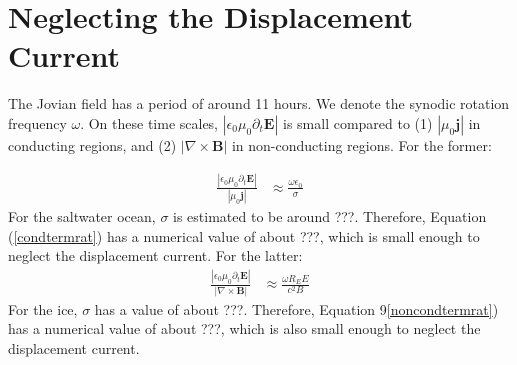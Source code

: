 \documentclass{article}
\begin{document}

\appendix
\section{Neglecting the Displacement Current} \label{Appendix_Displacement_Current}
The Jovian field has a period of around 11 hours. We denote the synodic rotation frequency $\omega$. On these time scales, $|\epsilon_0\mu_0\partial_t\mathbf{E}|$ is small  compared to (1) $|\mu_0\mathbf{j}|$ in conducting regions, and (2) $|\nabla\times\mathbf{B}|$ in non-conducting regions. For the former:

\begin{align}
    \frac{\left|\epsilon_0\mu_0\partial_t\mathbf{E}\right|}{\left|\mu_0\mathbf{j}\right|} &\approx \frac{\omega\epsilon_0}{\sigma} \label{condtermrat}
\end{align}
For the saltwater ocean, $\sigma$ is estimated to be around ???. Therefore, Equation (\ref{condtermrat}) has a numerical value of about ???, which is small enough to neglect the displacement current. For the latter:
\begin{align}
    \frac{\left|\epsilon_0\mu_0\partial_t\mathbf{E}\right|}{\left|\nabla\times\mathbf{B}\right|} &\approx \frac{\omega R_EE}{c^2B} \label{noncondtermrat}
\end{align}
 For the ice, $\sigma$ has a value of about ???. Therefore, Equation 9\ref{noncondtermrat}) has a numerical value of about ???, which is also small enough to neglect the displacement current.
\end{document}
